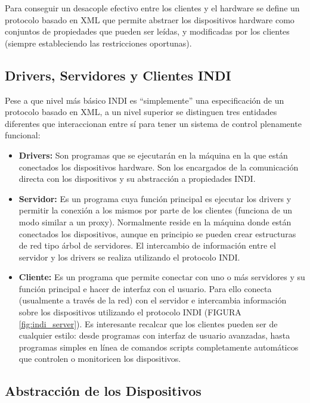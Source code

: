 \bigskip
Para conseguir un desacople efectivo entre los clientes y el hardware se define un protocolo basado en XML que permite abstraer los dispositivos hardware como conjuntos de propiedades que pueden ser leídas, y modificadas por los clientes (siempre estableciendo las restricciones oportunas).


\subsection{Drivers, Servidores y Clientes INDI}

Pese a que nivel más básico INDI es ``simplemente'' una especificación de un protocolo basado en XML, a un nivel superior se distinguen tres entidades diferentes que interaccionan entre sí para tener un sistema de control plenamente funcional:

\begin{itemize}
  \item \textbf{Drivers:} Son programas que se ejecutarán en la máquina en la que están conectados los dispositivos hardware. Son los encargados de la comunicación directa con los dispositivos y su abstracción a propiedades INDI.
  
  \item \textbf{Servidor:} Es un programa cuya función principal es ejecutar los drivers y permitir la conexión a los mismos por parte de los clientes (funciona de un modo similar a un proxy). Normalmente reside en la máquina donde están conectados los dispositivos, aunque en principio se pueden crear estructuras de red tipo árbol de servidores. El intercambio de información entre el servidor y los drivers se realiza utilizando el protocolo INDI.
  
  \item \textbf{Cliente:} Es un programa que permite conectar con uno o más servidores y su función principal e hacer de interfaz con el usuario. Para ello conecta (usualmente a través de la red) con el servidor e intercambia información sobre los dispositivos utilizando el protocolo INDI (FIGURA \ref{fig:indi_server}). Es interesante recalcar que los clientes pueden ser de cualquier estilo: desde programas con interfaz de usuario avanzadas, hasta programas simples en línea de comandos scripts completamente automáticos que controlen o monitoricen los dispositivos.
\end{itemize}


\subsection{Abstracción de los Dispositivos}

